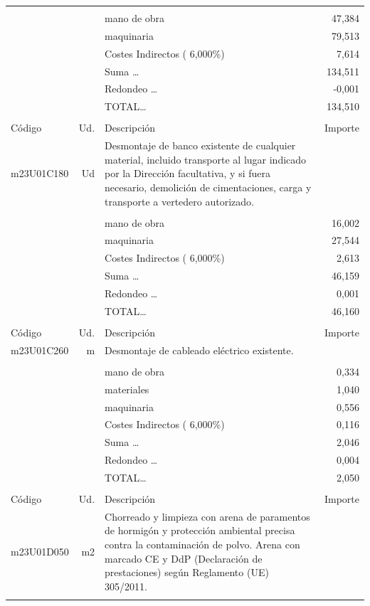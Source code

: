 \documentclass{book}%
\begin{document}
\begin{supertabular}{l r p{60mm} r}
&&&\\%
&&mano de obra&    47,384\\%
&&maquinaria&    79,513\\%
&&Costes Indirectos (     6,000\%)&     7,614\\%
&&Suma \ldots&   134,511\\%
&&Redondeo \ldots&    {-}0,001\\%
%
&&TOTAL\ldots&   134,510\\%
&&&\\%
Código&Ud.&Descripción&Importe\\%
\hline%
m23U01C180&Ud&Desmontaje de banco existente de cualquier material, incluido transporte al lugar indicado por la Dirección facultativa, y si fuera necesario, demolición de cimentaciones, carga y transporte a vertedero autorizado.&\\%
&&&\\%
&&mano de obra&    16,002\\%
&&maquinaria&    27,544\\%
&&Costes Indirectos (     6,000\%)&     2,613\\%
&&Suma \ldots&    46,159\\%
&&Redondeo \ldots&     0,001\\%
%
&&TOTAL\ldots&    46,160\\%
&&&\\%
Código&Ud.&Descripción&Importe\\%
\hline%
m23U01C260&m&Desmontaje de cableado eléctrico existente.&\\%
&&&\\%
&&mano de obra&     0,334\\%
&&materiales&     1,040\\%
&&maquinaria&     0,556\\%
&&Costes Indirectos (     6,000\%)&     0,116\\%
&&Suma \ldots&     2,046\\%
&&Redondeo \ldots&     0,004\\%
%
&&TOTAL\ldots&     2,050\\%
&&&\\%
Código&Ud.&Descripción&Importe\\%
\hline%
m23U01D050&m2&Chorreado y limpieza con arena de paramentos de hormigón y protección ambiental precisa contra la contaminación de polvo. Arena con marcado CE y DdP (Declaración de prestaciones) según Reglamento (UE) 305/2011.&\\%
&&&\\%

\end{supertabular}
\end{document}
